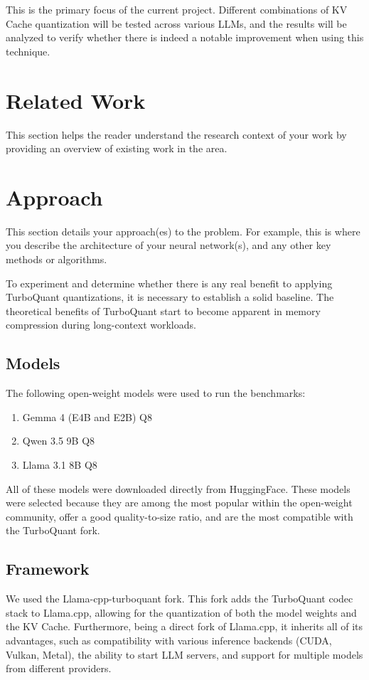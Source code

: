 \documentclass{article}
\begin{document}
This is the primary focus of the current project. Different combinations of KV Cache quantization will be tested across various LLMs, and the results will be analyzed to verify whether there is indeed a notable improvement when using this technique.

\section{Related Work}
This section helps the reader understand the research context of your work by providing an overview of existing work in the area.

\section{Approach}
This section details your approach(es) to the problem. 
For example, this is where you describe the architecture of your neural network(s), and any other key methods or algorithms.

To experiment and determine whether there is any real benefit to applying TurboQuant quantizations, it is necessary to establish a solid baseline.
The theoretical benefits of TurboQuant start to become apparent in memory compression during long-context workloads.
\subsection{Models}
The following open-weight models were used to run the benchmarks:
\begin{enumerate}
  \item Gemma 4 (E4B and E2B) Q8
  \item Qwen 3.5 9B Q8
  \item Llama 3.1 8B Q8
\end{enumerate}
All of these models were downloaded directly from HuggingFace.
These models were selected because they are among the most popular within the open-weight community, offer a good quality-to-size ratio, and are the most compatible with the TurboQuant fork.

\subsection{Framework}
We used the Llama-cpp-turboquant fork. This fork adds the TurboQuant codec stack to Llama.cpp, allowing for the quantization of both the model weights and the KV Cache. Furthermore, being a direct fork of Llama.cpp, it inherits all of its advantages, such as compatibility with various inference backends (CUDA, Vulkan, Metal), the ability to start LLM servers, and support for multiple models from different providers.
\end{document}
